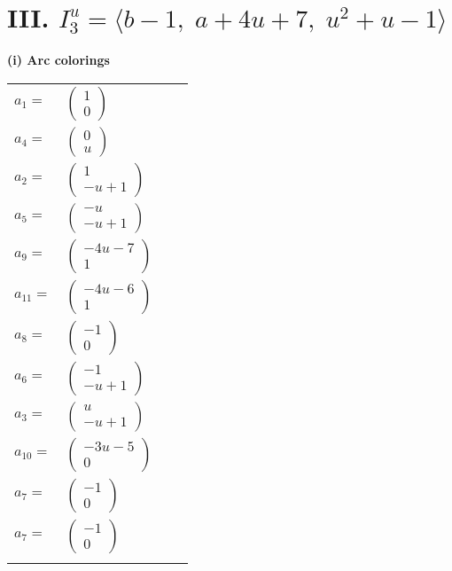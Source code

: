 \documentclass[1p]{elsarticle_modified}
\theoremstyle{definition}
\begin{document}
\centering \section*{III. $I^u_{3}= \langle b-1,\;a+4 u+7,\;u^2+u-1 \rangle$}
\flushleft \textbf{(i) Arc colorings}\\
\begin{tabular}{m{7pt} m{180pt} m{7pt} m{180pt} }
\flushright $a_{1}=$&$\begin{pmatrix}1\\0\end{pmatrix}$ \\
\flushright $a_{4}=$&$\begin{pmatrix}0\\u\end{pmatrix}$ \\
\flushright $a_{2}=$&$\begin{pmatrix}1\\- u+1\end{pmatrix}$ \\
\flushright $a_{5}=$&$\begin{pmatrix}- u\\- u+1\end{pmatrix}$ \\
\flushright $a_{9}=$&$\begin{pmatrix}-4 u-7\\1\end{pmatrix}$ \\
\flushright $a_{11}=$&$\begin{pmatrix}-4 u-6\\1\end{pmatrix}$ \\
\flushright $a_{8}=$&$\begin{pmatrix}-1\\0\end{pmatrix}$ \\
\flushright $a_{6}=$&$\begin{pmatrix}-1\\- u+1\end{pmatrix}$ \\
\flushright $a_{3}=$&$\begin{pmatrix}u\\- u+1\end{pmatrix}$ \\
\flushright $a_{10}=$&$\begin{pmatrix}-3 u-5\\0\end{pmatrix}$ \\
\flushright $a_{7}=$&$\begin{pmatrix}-1\\0\end{pmatrix}$\\ \flushright $a_{7}=$&$\begin{pmatrix}-1\\0\end{pmatrix}$\\&\end{tabular}
\end{document}
